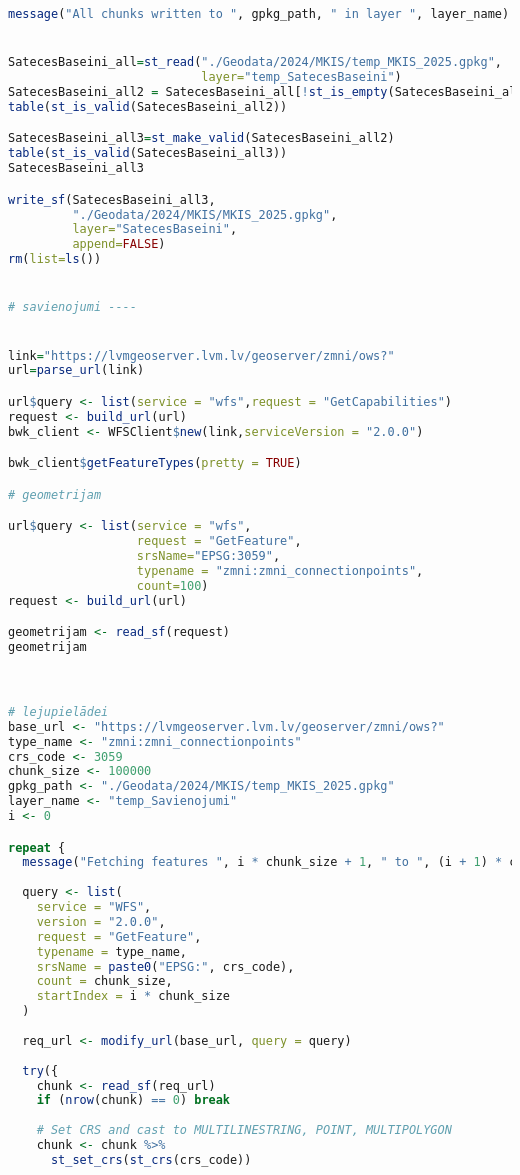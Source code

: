 \documentclass[
]{book}
\begin{document}
\begin{lstlisting}[language=R]
message("All chunks written to ", gpkg_path, " in layer ", layer_name)


SatecesBaseini_all=st_read("./Geodata/2024/MKIS/temp_MKIS_2025.gpkg",
                           layer="temp_SatecesBaseini")
SatecesBaseini_all2 = SatecesBaseini_all[!st_is_empty(SatecesBaseini_all),,drop=FALSE] # 0
table(st_is_valid(SatecesBaseini_all2))

SatecesBaseini_all3=st_make_valid(SatecesBaseini_all2)
table(st_is_valid(SatecesBaseini_all3))
SatecesBaseini_all3

write_sf(SatecesBaseini_all3,
         "./Geodata/2024/MKIS/MKIS_2025.gpkg",
         layer="SatecesBaseini",
         append=FALSE)
rm(list=ls())


# savienojumi ----


link="https://lvmgeoserver.lvm.lv/geoserver/zmni/ows?"
url=parse_url(link)

url$query <- list(service = "wfs",request = "GetCapabilities")
request <- build_url(url)
bwk_client <- WFSClient$new(link,serviceVersion = "2.0.0")

bwk_client$getFeatureTypes(pretty = TRUE)

# geometrijam

url$query <- list(service = "wfs",
                  request = "GetFeature",
                  srsName="EPSG:3059",
                  typename = "zmni:zmni_connectionpoints",
                  count=100)
request <- build_url(url)

geometrijam <- read_sf(request)
geometrijam



# lejupielādei
base_url <- "https://lvmgeoserver.lvm.lv/geoserver/zmni/ows?"
type_name <- "zmni:zmni_connectionpoints"
crs_code <- 3059
chunk_size <- 100000
gpkg_path <- "./Geodata/2024/MKIS/temp_MKIS_2025.gpkg"
layer_name <- "temp_Savienojumi"
i <- 0

repeat {
  message("Fetching features ", i * chunk_size + 1, " to ", (i + 1) * chunk_size, "...")
  
  query <- list(
    service = "WFS",
    version = "2.0.0",
    request = "GetFeature",
    typename = type_name,
    srsName = paste0("EPSG:", crs_code),
    count = chunk_size,
    startIndex = i * chunk_size
  )
  
  req_url <- modify_url(base_url, query = query)
  
  try({
    chunk <- read_sf(req_url)
    if (nrow(chunk) == 0) break
    
    # Set CRS and cast to MULTILINESTRING, POINT, MULTIPOLYGON
    chunk <- chunk %>%
      st_set_crs(st_crs(crs_code))
    

\end{lstlisting}
\end{document}

